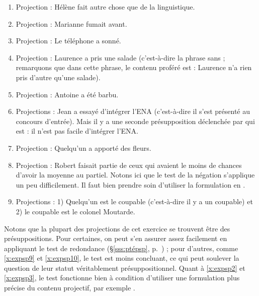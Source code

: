 \begin{exo}
\begin{solu}
\begin{enumerate}
\item %
Projection : Hélène fait autre chose que de la linguistique.

\item %
Projection : Marianne fumait avant.

\item %
Projection : Le téléphone a sonné.

\item %
Projection : Laurence a pris une salade (c'est-à-dire la phrase sans  ;  remarquons que dans cette
phrase, le  contenu proféré est : Laurence n'a rien pris d'autre qu'une
salade). 

\item %
Projection : Antoine a été barbu.

\item %
Projections : Jean a essayé d'intégrer l'ENA (c'est-à-dire il s'est présenté au
concours d'entrée).  Mais il y a une seconde présupposition déclenchée par  qui est : il n'est pas facile d'intégrer l'ENA.

\item %
Projection : Quelqu'un a apporté des fleurs.

\item %
Projection : Robert faisait partie de ceux qui avaient le moins de chances d'avoir la moyenne au partiel.  Notons ici que le test de la négation s'applique un peu
difficilement. Il faut bien prendre soin d'utiliser la formulation en
.

\item %
Projections : 1) Quelqu'un est le coupable (c'est-à-dire  il y a un coupable) et 2)
le coupable est le colonel Moutarde. 
\end{enumerate}

Notons que la plupart des projections de cet exercice se trouvent être des présuppositions. Pour certaines, on peut s'en assurer assez facilement en appliquant le test de redondance (\S\ref{sss:ptépsp}, p.~\pageref{p.testAB}) ; pour d'autres, comme \ref{x:expsp9} et \ref{x:expsp10}, le test est moins concluant, ce qui peut soulever la question de leur statut véritablement présuppositionnel. Quant à \ref{x:expsp2} et \ref{x:expsp3}, le test fonctionne bien à condition d'utiliser une formulation plus précise du contenu projectif, par exemple  {\vs} {\zarb}.

\end{solu}
\end{exo}
